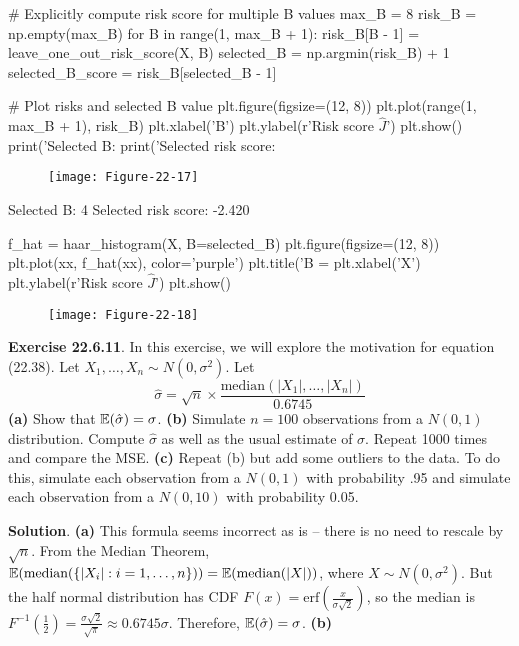 \begin{python}
# Explicitly compute risk score for multiple B values
max_B = 8
risk_B = np.empty(max_B)
for B in range(1, max_B + 1):
    risk_B[B - 1] = leave_one_out_risk_score(X, B)
selected_B = np.argmin(risk_B) + 1
selected_B_score = risk_B[selected_B - 1]
\end{python}

\begin{python}
# Plot risks and selected B value
plt.figure(figsize=(12, 8))
plt.plot(range(1, max_B + 1), risk_B)
plt.xlabel('B')
plt.ylabel(r'Risk score $\hat{J}$')
plt.show()
print('Selected B: %
print('Selected risk score: %
\end{python}

\begin{figure}[H]
\centering
\texttt{[image: Figure-22-17]}
\end{figure}

\begin{console}
Selected B: 4
Selected risk score: -2.420
\end{console}

\begin{python}
f_hat = haar_histogram(X, B=selected_B)
plt.figure(figsize=(12, 8))
plt.plot(xx, f_hat(xx), color='purple')
plt.title('B = %
plt.xlabel('X')
plt.ylabel(r'Risk score $\hat{J}$')
plt.show()
\end{python}

\begin{figure}[H]
\centering
\texttt{[image: Figure-22-18]}
\end{figure}


\textbf{Exercise 22.6.11}. In this exercise, we will explore the
motivation for equation (22.38). Let
\(X_{1}, \dots, X_{n} \sim N(0, \sigma^{2})\). Let
\[
\hat{\sigma} = \sqrt{n} \times \frac{\text{median} (| X_{1}|, \dots, |X_{n}|)}{0.6745}
\]
\textbf{(a)} Show that \(\operatorname{\mathbb{E}}(\hat{\sigma}) = \sigma\).
\textbf{(b)} Simulate \(n = 100\) observations from a \(N(0, 1)\)
distribution. Compute \(\hat{\sigma}\) as well as the usual estimate of
\(\sigma\). Repeat 1000 times and compare the MSE.
\textbf{(c)} Repeat (b) but add some outliers to the data. To do this,
simulate each observation from a \(N(0, 1)\) with probability .95 and
simulate each observation from a \(N(0, 10)\) with probability 0.05.

\textbf{Solution}.
\textbf{(a)} This formula seems incorrect as is -- there is no need to
rescale by \(\sqrt{n}\).
From the Median Theorem,
\(\operatorname{\mathbb{E}}(\text{median}( \{ |X_{i}| : i = 1, \dots, n \} )) = \operatorname{\mathbb{E}}(\text{median}(|X|))\),
where \(X \sim N(0, \sigma^{2})\). But the half normal distribution has
CDF \(F(x) = \text{erf}\left(\frac{x}{\sigma \sqrt{2}}\right)\), so the
median is
\(F^{-1}\left(\frac{1}{2}\right) = \frac{\sigma \sqrt{2}}{\sqrt{\pi}} \approx 0.6745 \sigma\).
Therefore, \(\operatorname{\mathbb{E}}(\hat{\sigma}) = \sigma\).
\textbf{(b)}

